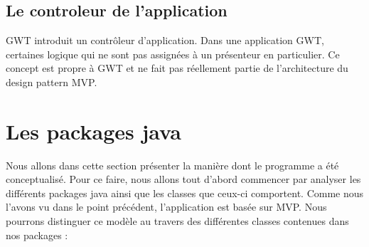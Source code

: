 \subsection{Le controleur de l'application} 
GWT introduit un contrôleur d'application. Dans une application GWT, certaines logique qui ne sont pas assignées à un présenteur en particulier. Ce concept est propre à GWT et ne fait pas réellement partie de l'architecture du design pattern MVP. 
 
\section{Les packages java}
Nous allons dans cette section présenter la manière dont le programme a été conceptualisé. Pour ce faire, nous allons tout d'abord commencer par analyser les différents packages java ainsi que les classes que ceux-ci comportent. Comme nous l'avons vu dans le point précédent, l'application est basée sur MVP. Nous pourrons distinguer ce modèle au travers des différentes classes contenues dans nos packages : \\

